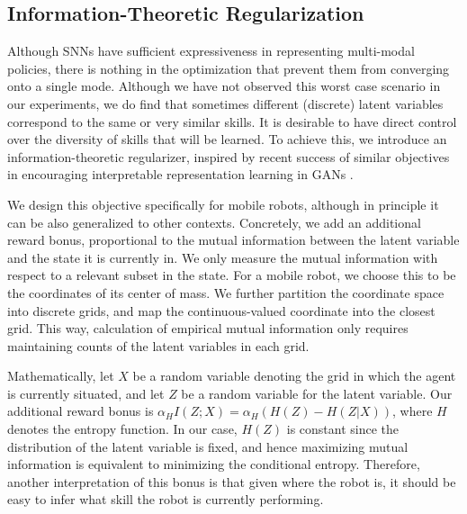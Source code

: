 \documentclass{article} %
\begin{document}

\subsection{Information-Theoretic Regularization}
\label{section:method:inforeg}

Although SNNs have sufficient expressiveness in representing multi-modal policies, there is nothing in the optimization that prevent them from converging onto a single mode. Although we have not observed this worst case scenario in our experiments, we do find that sometimes different (discrete) latent variables correspond to the same or very similar skills. It is desirable to have direct control over the diversity of skills that will be learned. To achieve this, we introduce an information-theoretic regularizer, inspired by recent success of similar objectives in encouraging interpretable representation learning in GANs \citep{chen2016infogan}.

We design this objective specifically for mobile robots, although in principle it can be also generalized to other contexts.
Concretely, we add an additional reward bonus, proportional to the mutual information between the latent variable and the state it is currently in. We only measure the mutual information with respect to a relevant subset in the state. For a mobile robot, we choose this to be the coordinates of its center of mass. We further partition the coordinate space into discrete grids, and map the continuous-valued coordinate into the closest grid. This way, calculation of empirical mutual information only requires maintaining counts of the latent variables in each grid.

Mathematically, let $X$ be a random variable denoting the grid in which the agent is currently situated, and let $Z$ be a random variable for the latent variable. Our additional reward bonus is $\alpha_H I(Z;X) = \alpha_H (H(Z) - H(Z|X))$, where $H$ denotes the entropy function. In our case, $H(Z)$ is constant since the distribution of the latent variable is fixed, and hence maximizing mutual information is equivalent to minimizing the conditional entropy. Therefore, another interpretation of this bonus is that given where the robot is, it should be easy to infer what skill the robot is currently performing. %
\end{document}
